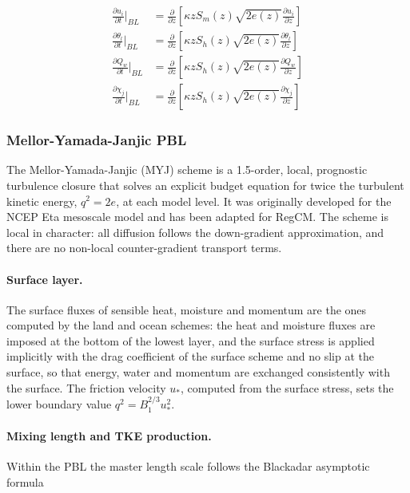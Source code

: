 \begin{subequations}\label{uwmodel}
\begin{align}
\frac{\partial u_i}{\partial t}\Bigr\rvert_{BL} &= \frac{\partial}{\partial z}[\kappa z S_m(z) \sqrt{2 e(z)} \frac{\partial u_i}{\partial z}]\label{uwmodela} \\
\frac{\partial \theta_l}{\partial t}\Bigr\rvert_{BL} &= \frac{\partial}{\partial z}[\kappa z S_h(z) \sqrt{2 e(z)} \frac{\partial \theta_l}{\partial z}]\label{uwmodelb} \\
\frac{\partial Q_w}{\partial t}\Bigr\rvert_{BL} &= \frac{\partial}{\partial z}[\kappa z S_h(z) \sqrt{2 e(z)} \frac{\partial Q_w}{\partial z}]\label{uwmodelc} \\
\frac{\partial \chi_j}{\partial t}\Bigr\rvert_{BL} &= \frac{\partial}{\partial z}[\kappa z S_h(z) \sqrt{2 e(z)} \frac{\partial \chi_j}{\partial z}]\label{uwmodeld}
\end{align}
\end{subequations}

\subsubsection{Mellor-Yamada-Janjic PBL}
\label{sec:myj}

The Mellor-Yamada-Janjic (MYJ) scheme \citep{Mellor_82,Janjic_94,Janjic_02} is
a 1.5-order, local, prognostic turbulence closure that solves an explicit
budget equation for twice the turbulent kinetic energy, $q^2 = 2e$, at each
model level.  It was originally developed for the NCEP Eta mesoscale model and
has been adapted for RegCM.  The scheme is local in character: all diffusion
follows the down-gradient approximation, and there are no non-local
counter-gradient transport terms.

\paragraph{Surface layer.}
The surface fluxes of sensible heat, moisture and momentum are the ones
computed by the land and ocean schemes: the heat and moisture fluxes are
imposed at the bottom of the lowest layer, and the surface stress is applied
implicitly with the drag coefficient of the surface scheme and no slip at the
surface, so that energy, water and momentum are exchanged consistently with
the surface.  The friction velocity $u_*$, computed from the surface stress,
sets the lower boundary value $q^2 = B_1^{2/3} u_*^2$.

\paragraph{Mixing length and TKE production.}
Within the PBL the master length scale follows the Blackadar asymptotic formula

